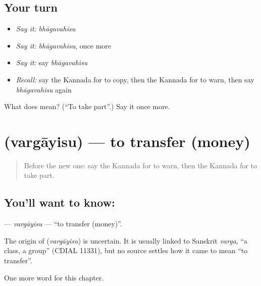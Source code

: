 \subsection*{Your turn}
\begin{itemize}
\raggedright
  \item \emph{Say it:} \emph{bhāgavahisu}
  \item \emph{Say it:} \emph{bhāgavahisu}, once more
  \item \emph{Say it:} say \emph{bhāgavahisu}
  \item \emph{Recall:} say the Kannada for to copy, then the Kannada for to warn, then say \emph{bhāgavahisu} again
\end{itemize}

\begin{tcolorbox}[breakable,colback=teal!4,colframe=teal!35!black,title={Before you move on}]
What does  mean? (\textquotedblleft{}To take part\textquotedblright{}.) Say it once more.
\end{tcolorbox}
\section[\texorpdfstring{\kn{ವರ್ಗಾಯಿಸು} (vargāyisu)}{ವರ್ಗಾಯಿಸು (vargāyisu)}]{ (vargāyisu) — to transfer (money)}

\label{lesson:KA-C162-vargayisu}



\begin{quote}
Before the new one: say the Kannada for to warn, then the Kannada for to take part.
\end{quote}

\subsection*{You'll want to know: }
\textbf{} — \emph{vargāyisu} — \textquotedblleft{}to transfer (money)\textquotedblright{}.

\begin{cousinweb}
The origin of \textbf{} (\emph{vargāyisu}) is uncertain. It is usually linked to Sanskrit \emph{varga}, \textquotedblleft{}a class, a group\textquotedblright{} (CDIAL 11331), but no source settles how it came to mean \textquotedblleft{}to transfer\textquotedblright{}.
\end{cousinweb}

\begin{grammarlens}[title={What you've built}]
One more word for this chapter.
\end{grammarlens}


